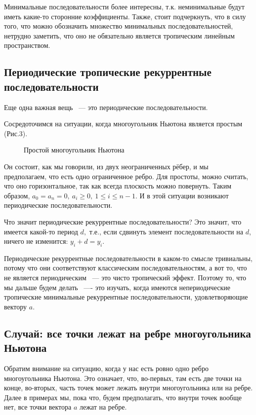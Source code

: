 \documentclass[russian]{lecture-notes}
\begin{document}
Минимальные последовательности более интересны, т.к.
неминимальные будут иметь какие-то сторонние коэффициенты. Также, стоит подчеркнуть, что в силу того, что можно обозначить множество минимальных последовательностей, нетрудно заметить, что оно не обязательно является тропическим линейным пространством.


\subsection{Периодические тропические рекуррентные последовательности}

Еще одна важная вещь ~--- это периодические
последовательности.


Сосредоточимся на ситуации,
когда многоугольник Ньютона является простым (Рис.3).

\begin{figure}[h!]
\caption{Простой многоугольник Ньютона}
\end{figure}

Он состоит, как мы говорили, из двух неограниченных рёбер, и мы предполагаем, что есть одно ограниченное ребро. Для простоты, можно считать, что оно горизонтальное, так как всегда плоскость можно повернуть. Таким образом, $a_0=a_n=0,\: a_i\geq 0,\: 1\leq i\leq n-1$. И в этой ситуации возникают периодические последовательности.

Что значит периодические рекуррентные последовательности? Это значит, что имеется какой-то период $d,$ т.е., если сдвинуть элемент последовательности на $d$, ничего не изменится: $y_i+d=y_i$.

Периодические рекуррентные последовательности в каком-то смысле тривиальны, потому что они соответствуют классическим последовательностям, а вот то, что не является периодическим ~--- это чисто тропический эффект. Поэтому то, что мы
дальше будем делать ~---- это изучать, когда имеются непериодические тропические минимальные рекуррентные последовательности, удовлетворяющие вектору $a$.

\subsection{Случай: все точки лежат на ребре многоугольника Ньютона}

Обратим внимание на ситуацию, когда у нас есть ровно одно ребро многоугольника Ньютона. Это означает, что, во-первых, там есть две точки на конце, во-вторых, часть точек может лежать внутри многоугольника или на ребре. Далее в примерах мы, пока что, будем предполагать, что внутри точек вообще нет, все точки вектора $a$ лежат на ребре.
\end{document}
